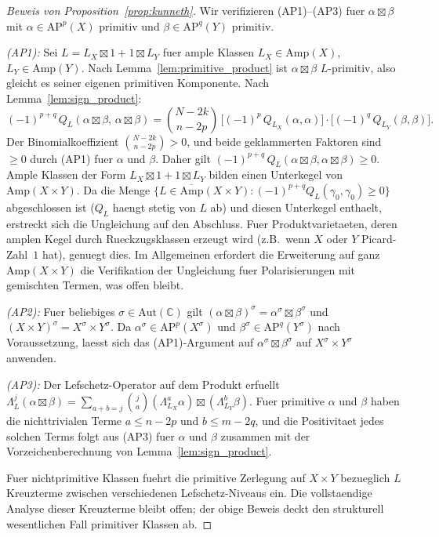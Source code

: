\documentclass[aps,prd,twocolumn,superscriptaddress,nofootinbib]{revtex4-2}
\theoremstyle{definition}
\theoremstyle{remark}
\begin{document}
\begin{proof}[Beweis von Proposition~\ref{prop:kunneth}]
Wir verifizieren (AP1)--(AP3) fuer $\alpha \boxtimes \beta$ mit $\alpha \in \mathrm{AP}^p(X)$ primitiv und $\beta \in \mathrm{AP}^q(Y)$ primitiv.

\textit{(AP1):} Sei $L = L_X \boxtimes 1 + 1 \boxtimes L_Y$ fuer ample Klassen $L_X \in \mathrm{Amp}(X)$, $L_Y \in \mathrm{Amp}(Y)$. Nach Lemma~\ref{lem:primitive_product} ist $\alpha \boxtimes \beta$ $L$-primitiv, also gleicht es seiner eigenen primitiven Komponente. Nach Lemma~\ref{lem:sign_product}:
\[
(-1)^{p+q}\, Q_L(\alpha \boxtimes \beta,\, \alpha \boxtimes \beta) = \binom{N-2k}{n-2p}\, \bigl[(-1)^p\, Q_{L_X}(\alpha, \alpha)\bigr] \cdot \bigl[(-1)^q\, Q_{L_Y}(\beta, \beta)\bigr].
\]
Der Binomialkoeffizient $\binom{N-2k}{n-2p} > 0$, und beide geklammerten Faktoren sind $\geq 0$ durch (AP1) fuer $\alpha$ und $\beta$. Daher gilt $(-1)^{p+q}\, Q_L(\alpha \boxtimes \beta, \alpha \boxtimes \beta) \geq 0$. Ample Klassen der Form $L_X \boxtimes 1 + 1 \boxtimes L_Y$ bilden einen Unterkegel von $\mathrm{Amp}(X \times Y)$. Da die Menge $\{L \in \overline{\mathrm{Amp}}(X \times Y) : (-1)^{p+q} Q_L(\gamma_0, \gamma_0) \geq 0\}$ abgeschlossen ist ($Q_L$ haengt stetig von $L$ ab) und diesen Unterkegel enthaelt, erstreckt sich die Ungleichung auf den Abschluss. Fuer Produktvarietaeten, deren amplen Kegel durch Rueckzugsklassen erzeugt wird (z.B.\ wenn $X$ oder $Y$ Picard-Zahl~$1$ hat), genuegt dies. Im Allgemeinen erfordert die Erweiterung auf ganz $\mathrm{Amp}(X \times Y)$ die Verifikation der Ungleichung fuer Polarisierungen mit gemischten Termen, was offen bleibt.

\textit{(AP2):} Fuer beliebiges $\sigma \in \mathrm{Aut}(\mathbb{C})$ gilt $(\alpha \boxtimes \beta)^\sigma = \alpha^\sigma \boxtimes \beta^\sigma$ und $(X \times Y)^\sigma = X^\sigma \times Y^\sigma$. Da $\alpha^\sigma \in \mathrm{AP}^p(X^\sigma)$ und $\beta^\sigma \in \mathrm{AP}^q(Y^\sigma)$ nach Voraussetzung, laesst sich das (AP1)-Argument auf $\alpha^\sigma \boxtimes \beta^\sigma$ auf $X^\sigma \times Y^\sigma$ anwenden.

\textit{(AP3):} Der Lefschetz-Operator auf dem Produkt erfuellt $\Lambda_L^j(\alpha \boxtimes \beta) = \sum_{a+b=j} \binom{j}{a} (\Lambda_{L_X}^a \alpha) \boxtimes (\Lambda_{L_Y}^b \beta)$. Fuer primitive $\alpha$ und $\beta$ haben die nichttrivialen Terme $a \leq n-2p$ und $b \leq m-2q$, und die Positivitaet jedes solchen Terms folgt aus (AP3) fuer $\alpha$ und $\beta$ zusammen mit der Vorzeichenberechnung von Lemma~\ref{lem:sign_product}.

Fuer nichtprimitive Klassen fuehrt die primitive Zerlegung auf $X \times Y$ bezueglich $L$ Kreuzterme zwischen verschiedenen Lefschetz-Niveaus ein. Die vollstaendige Analyse dieser Kreuzterme bleibt offen; der obige Beweis deckt den strukturell wesentlichen Fall primitiver Klassen ab.
\end{proof}
\end{document}
